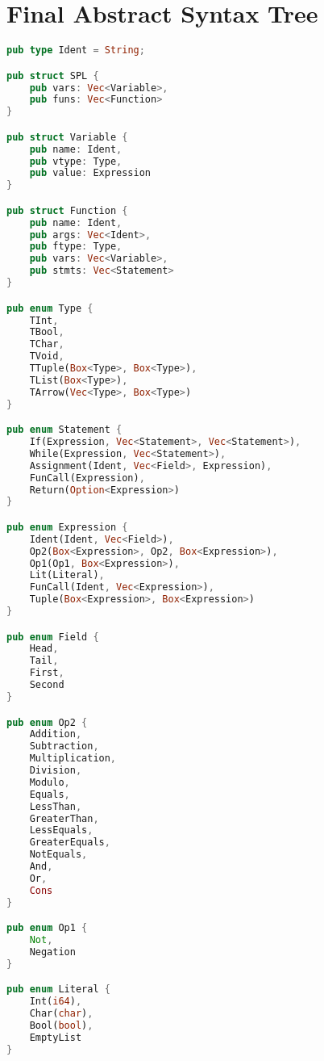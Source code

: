 \documentclass{article}
\begin{document}
\section{Final Abstract Syntax Tree}
\label{Appendix2}
\begin{lstlisting}[language=Rust, style=boxed]
pub type Ident = String;

pub struct SPL {
	pub vars: Vec<Variable>,
	pub funs: Vec<Function>
}

pub struct Variable {
	pub name: Ident,
	pub vtype: Type,
	pub value: Expression
}

pub struct Function {
	pub name: Ident,
	pub args: Vec<Ident>,
	pub ftype: Type,
	pub vars: Vec<Variable>,
	pub stmts: Vec<Statement>
}

pub enum Type {
	TInt,
	TBool,
	TChar,
	TVoid,
	TTuple(Box<Type>, Box<Type>),
	TList(Box<Type>),
	TArrow(Vec<Type>, Box<Type>)
}

pub enum Statement {
	If(Expression, Vec<Statement>, Vec<Statement>),
	While(Expression, Vec<Statement>),
	Assignment(Ident, Vec<Field>, Expression),
	FunCall(Expression),
	Return(Option<Expression>)
}

pub enum Expression {
	Ident(Ident, Vec<Field>),
	Op2(Box<Expression>, Op2, Box<Expression>),
	Op1(Op1, Box<Expression>),
	Lit(Literal),
	FunCall(Ident, Vec<Expression>),
	Tuple(Box<Expression>, Box<Expression>)
}

pub enum Field {
	Head,
	Tail,
	First,
	Second
}

pub enum Op2 {
	Addition,
	Subtraction,
	Multiplication,
	Division,
	Modulo,
	Equals,
	LessThan,
	GreaterThan,
	LessEquals,
	GreaterEquals,
	NotEquals,
	And,
	Or,
	Cons
}

pub enum Op1 {
	Not,
	Negation
}

pub enum Literal {
	Int(i64),
	Char(char),
	Bool(bool),
	EmptyList
}
\end{lstlisting}
\end{document}
